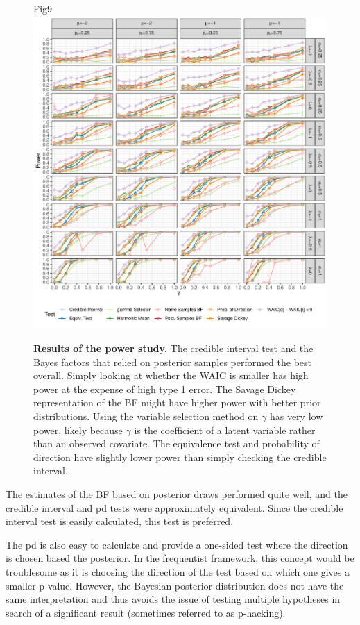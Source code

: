 \documentclass[10pt,letterpaper]{article}
\begin{document}
\begin{figure}[h!]
\centering
Fig9
\includegraphics[width=\textwidth]{Joint_Count_Files/powers-1.pdf}
\caption{\label{powers}\textbf{Results of the power study.} The credible interval
test and the Bayes factors that relied on posterior samples performed
the best overall. Simply looking at whether the WAIC is smaller has high
power at the expense of high type 1 error. The Savage Dickey
representation of the BF might have higher power with better prior
distributions. Using the variable selection method on \(\gamma\) has
very low power, likely because \(\gamma\) is the coefficient of a latent
variable rather than an observed covariate. The equivalence test and
probability of direction have slightly lower power than simply checking
the credible interval.}
\end{figure}

The estimates of the BF based on posterior draws performed quite well,
and the credible interval and pd tests were approximately equivalent.
Since the credible interval test is easily calculated, this test is
preferred.

The pd is also easy to calculate and provide a one-sided test where the
direction is chosen based the posterior. In the frequentist framework,
this concept would be troublesome as it is choosing the direction of the
test based on which one gives a smaller p-value. However, the Bayesian
posterior distribution does not have the same interpretation and thus
avoids the issue of testing multiple hypotheses in search of a significant result (sometimes referred to as p-hacking).
\end{document}
